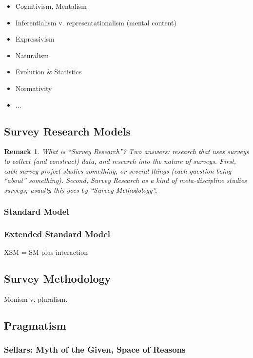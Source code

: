 \documentclass[11pt,twoside]{article}
\newtheorem{remark}{Remark}
\newcommand{\SM}{Standard Model}
\newcommand{\XSM}{Extended Standard Model}
\newcommand{\SMeth}{Survey Methodology}
\newcommand{\SR}{Survey Research}
\begin{document}
\begin{itemize}
\item Cognitivism, Mentalism
\item Inferentialism v. representationalism (mental content)
\item Expressivism
\item Naturalism
\item Evolution \& Statistics
\item Normativity
\item ...
\end{itemize}

\subsection{\SR{} Models}

\begin{remark}
What is ``\SR{}''?  Two answers: research that \textit{uses} surveys
to collect (and construct) data, and research into the nature of
surveys.  First, each survey project studies something, or several
things (each question being ``about'' something).  Second, \SR{} as a
kind of meta-discipline studies surveys; usually this goes by
``\SMeth{}''.
\end{remark}

\subsubsection{\SM{}}

\subsubsection{\XSM{}}

XSM = SM plus interaction

\subsection{Survey Methodology}

Monism v. pluralism.

\subsection{Pragmatism}

\subsubsection{Sellars: Myth of the Given, Space of Reasons}
\end{document}
